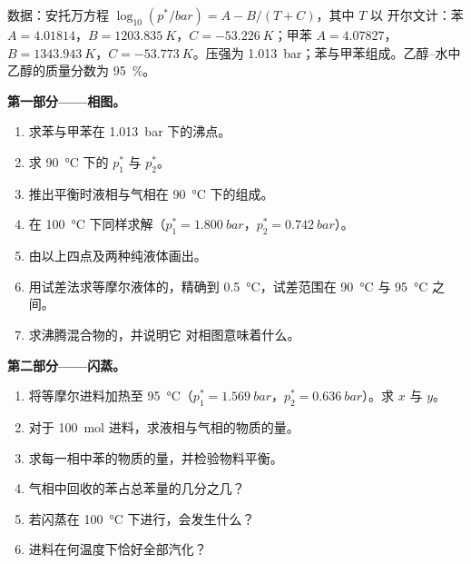\begin{problem}
\label{pb:b2:liquid-vapour-diagrams:1}
数据：安托万方程 $\log_{10}(p^*/\unit{bar}) = A - B/(T + C)$，其中 $T$ 以
开尔文计：苯 $A = 4.01814$，$B = \qty{1203.835}{K}$，$C =
\qty{-53.226}{K}$；甲苯 $A = 4.07827$，$B = \qty{1343.943}{K}$，$C =
\qty{-53.773}{K}$。压强为 \qty{1.013}{bar}；苯与甲苯组成。乙醇–水中乙醇的质量分数为 95~\%。

\medskip
\noindent\textbf{第一部分——相图。}
\begin{enumerate}
  \item 求苯与甲苯在 \qty{1.013}{bar} 下的沸点。
  \item 求 \qty{90}{\degreeCelsius} 下的 $p_1^*$ 与 $p_2^*$。
  \item 推出平衡时液相与气相在
        \qty{90}{\degreeCelsius} 下的组成。
  \item 在 \qty{100}{\degreeCelsius} 下同样求解（$p_1^* = \qty{1.800}{bar}$，$p_2^* =
        \qty{0.742}{bar}$）。
  \item 由以上四点及两种纯液体画出。
  \item 用试差法求等摩尔液体的，精确到
        \qty{0.5}{\degreeCelsius}，试差范围在 \qty{90}{\degreeCelsius} 与
        \qty{95}{\degreeCelsius} 之间。
  \item 求沸腾混合物的，并说明它
        对相图意味着什么。
\end{enumerate}

\medskip
\noindent\textbf{第二部分——闪蒸。}
\begin{enumerate}[resume]
  \item 将等摩尔进料加热至 \qty{95}{\degreeCelsius}（$p_1^* =
        \qty{1.569}{bar}$，$p_2^* = \qty{0.636}{bar}$）。求 $x$ 与 $y$。
  \item 对于 \qty{100}{mol} 进料，求液相与气相的物质的量。
  \item 求每一相中苯的物质的量，并检验物料平衡。
  \item 气相中回收的苯占总苯量的几分之几？
  \item 若闪蒸在 \qty{100}{\degreeCelsius} 下进行，会发生什么？
  \item 进料在何温度下恰好全部汽化？
\end{enumerate}


\end{problem}
